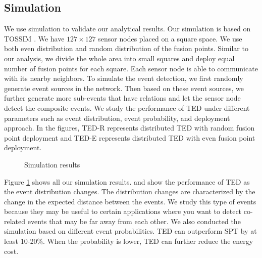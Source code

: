 \subsection{Simulation}
\label{sec:simulation}
We use simulation to validate our analytical results. Our simulation is based on TOSSIM \cite{tossim}. We have \(127\times 127\) sensor nodes placed on a square space. We use both even distribution and random distribution of the fusion points. Similar to our analysis, we divide the whole area into small squares and deploy equal number of fusion points for each square. Each sensor node is able to communicate with its nearby neighbors. To simulate the event detection, we first randomly generate event sources in the network. Then based on these event sources, we further generate more sub-events that have relations and let the sensor node detect the composite events. We study the performance of TED under different parameters such as event distribution, event probability, and deployment approach. In the figures, TED-R represents distributed TED with random fusion point deployment and TED-E represents distributed TED with even fusion point deployment.

\begin{figure}
\centering
{}
\qquad
{}
\caption{Simulation results}
\label{fig:sim-all}
\end{figure}

Figure \ref{fig:sim-all} shows all our simulation results.  and  show the performance of TED as the event distribution changes. The distribution changes are characterized by the change in the expected distance between the events. We study this type of events because they may be useful to certain applications where you want to detect co-related events that may be far away from each other. We also conducted the simulation based on different event probabilities. TED can outperform SPT by at least 10-20\%. When the probability is lower, TED can further reduce the energy cost.

